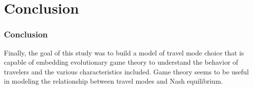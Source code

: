 \documentclass[aspectratio=169]{beamer}
\begin{document}
\section{Conclusion}
\begin{frame}


\frametitle{Conclusion}
Finally, the goal of this study was to build a model of travel mode choice that is capable of embedding evolutionary game theory to understand the behavior of travelers and the various characteristics included.
Game theory seems to be useful in modeling the relationship between travel modes and Nash equilibrium.
\end{frame}
\end{document}
